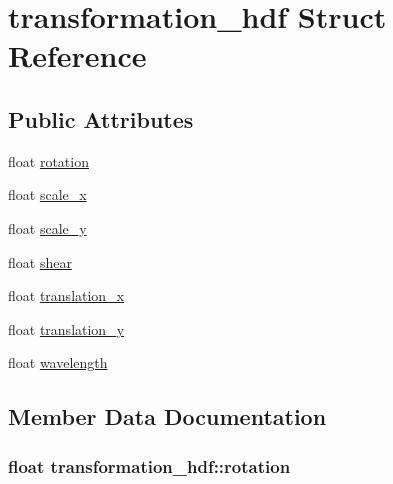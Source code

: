 \hypertarget{structtransformation__hdf}{}\section{transformation\+\_\+hdf Struct Reference}
\label{structtransformation__hdf}
\subsection*{Public Attributes}
\begin{DoxyCompactItemize}
\item 
float \hyperlink{structtransformation__hdf_a6bf990dbca06fc07556d2abb81186996}{rotation}
\item 
float \hyperlink{structtransformation__hdf_a723dada17c6e7779401f9a01cc000140}{scale\+\_\+x}
\item 
float \hyperlink{structtransformation__hdf_a37f6a6542b1f9770136143d76913b5b6}{scale\+\_\+y}
\item 
float \hyperlink{structtransformation__hdf_a2cf7008d33b93598b0ab16f0c5e9beff}{shear}
\item 
float \hyperlink{structtransformation__hdf_ab2661d32d97e2920e0c6605465da0175}{translation\+\_\+x}
\item 
float \hyperlink{structtransformation__hdf_a70ae64c8b9c2e7b98abd2560830766d7}{translation\+\_\+y}
\item 
float \hyperlink{structtransformation__hdf_ad9b54c3826be9ab59e277a37e1b86168}{wavelength}
\end{DoxyCompactItemize}


\subsection{Member Data Documentation}
\subsubsection[{\texorpdfstring{rotation}{rotation}}]{\setlength{\rightskip}{0pt plus 5cm}float transformation\+\_\+hdf\+::rotation}\hypertarget{structtransformation__hdf_a6bf990dbca06fc07556d2abb81186996}{}\label{structtransformation__hdf_a6bf990dbca06fc07556d2abb81186996}
